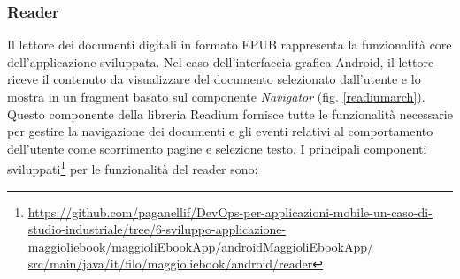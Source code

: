 \subsubsection*{Reader}
Il lettore dei documenti digitali in formato EPUB rappresenta la funzionalità core dell'applicazione sviluppata. 
Nel caso dell'interfaccia grafica Android,
il lettore riceve il contenuto da visualizzare del documento selezionato dall'utente e lo mostra in un fragment basato sul componente \textit{Navigator} (fig. \ref{readiumarch}). 
Questo componente della libreria Readium fornisce tutte le funzionalità necessarie per gestire la navigazione dei documenti e gli eventi relativi al comportamento dell'utente come scorrimento pagine e selezione testo. 
I principali componenti sviluppati\footnote{\href{https://github.com/paganellif/DevOps-per-applicazioni-mobile-un-caso-di-studio-industriale/tree/6-sviluppo-applicazione-maggioliebook/maggioliEbookApp/androidMaggioliEbookApp/src/main/java/it/filo/maggioliebook/android/reader}{https://github.com/paganellif/DevOps-per-applicazioni-mobile-un-caso-di-studio-industriale/tree/6-sviluppo-applicazione-maggioliebook/maggioliEbookApp/androidMaggioliEbookApp/\\src/main/java/it/filo/maggioliebook/android/reader}} per le funzionalità del reader sono:

